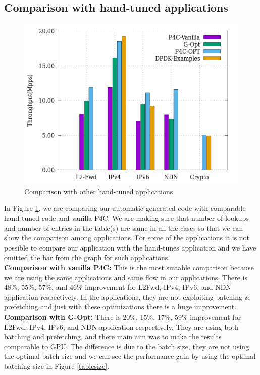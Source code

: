 \subsection{Comparison with hand-tuned applications}
\label{comparisonexperiment}
\begin{figure}[ht]
\includegraphics[width = \linewidth]{Figures/comparison.png}
\caption{Comparison with other hand-tuned applications}
\label{comparisonfigure}
\end{figure}
In Figure \ref{comparisonfigure}, we are comparing our automatic generated code with comparable hand-tuned code and vanilla P4C\cite{Laki:2016:HSP:2934872.2959080}. We are making sure that number of lookups and number of entries in the table(s) are same in all the cases so that we can show the comparison among applications. For some of the applications it is not possible to compare our application with the hand-tunes application and we have omitted the bar from the graph for such applications.
\\
\textbf{Comparison with vanilla P4C\cite{Laki:2016:HSP:2934872.2959080}:} This is the most suitable comparison because we are using the same applications and same flow in our applications. There is 48\%, 55\%, 57\%, and 46\% improvement for L2Fwd, IPv4, IPv6, and NDN application respectively. In the applications, they are not exploiting batching \& prefetching and just with these optimizations there is a huge improvement.
\\
\textbf{Comparison with G-Opt\cite{189006}:} There is 20\%, 15\%, 17\%, 59\% improvement for L2Fwd, IPv4, IPv6, and NDN application respectively. They are using both batching and prefetching, and there main aim was to make the results comparable to GPU. The difference is due to the batch size, they are not using the optimal batch size and we can see the performance gain by using the optimal batching size in Figure \ref{tablesize}.
